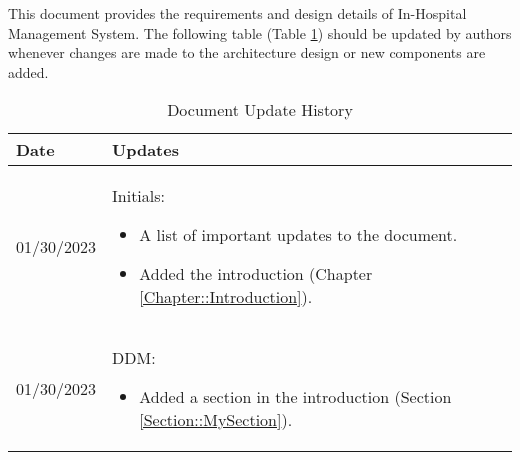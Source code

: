 This document provides the requirements and design details of In-Hospital Management System.  
The following table (Table \ref{Table::UpdateHistory}) should be
updated by authors whenever changes are made to the architecture
design or new components are added.  

\begin{longtable}{|l||p{13.5cm}|}
\caption{Document Update History \label{Table::UpdateHistory}}\\
\hline
\textbf{Date} & \textbf{Updates} \\
\hline 
\endhead

01/30/2023 & Initials:
\begin{itemize}[topsep=0pt,itemsep=0pt,parsep=0pt,partopsep=0pt,leftmargin=12pt]
\item A list of important updates to the document.
\item Added the introduction (Chapter \ref{Chapter::Introduction}). 
\end{itemize} 
\\ \hline

01/30/2023 & DDM:
\begin{itemize}[topsep=0pt,itemsep=0pt,parsep=0pt,partopsep=0pt,leftmargin=12pt]
\item Added a section in the introduction (Section \ref{Section::MySection}).
\end{itemize} 
\\ \hline


\end{longtable}


